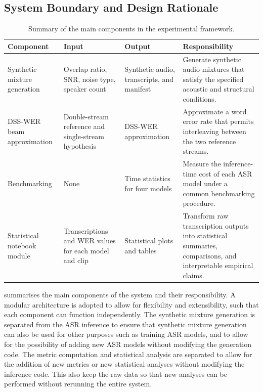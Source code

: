 \subsection{System Boundary and Design Rationale}
\begin{table}[ht]
\centering
\caption{Summary of the main components in the experimental framework.}
\label{tab:system_components}
\begin{tabular}{p{3.2cm}p{3.1cm}p{3.2cm}p{5.2cm}}
\toprule
\textbf{Component} & \textbf{Input} & \textbf{Output} & \textbf{Responsibility} \\
\midrule
Synthetic mixture generation &
Overlap ratio, SNR, noise type, speaker count &
Synthetic audio, transcripts, and manifest &
Generate synthetic audio mixtures that satisfy the specified acoustic and structural conditions. \\
\hline
DSS-WER beam approximation &
Double-stream reference and single-stream hypothesis &
DSS-WER approximation &
Approximate a word error rate that permits interleaving between the two reference streams. \\
\hline
Benchmarking &
None &
Time statistics for four models &
Measure the inference-time cost of each ASR model under a common benchmarking procedure. \\
\hline
Statistical notebook module &
Transcriptions and WER values for each model and clip &
Statistical plots and tables &
Transform raw transcription outputs into statistical summaries, comparisons, and interpretable empirical claims. \\
\bottomrule
\end{tabular}
\end{table}
 summarises the main components of the system and their responsibility. A modular architecture is adopted to allow for flexibility and extensibility, such that each component can function independently.
The synthetic mixture generation is separated from the ASR inference to ensure that synthetic mixture generation can also be used for other purposes such as training ASR models, and to allow for the possibility of adding new ASR models without modifying the generation code. The metric computation and statistical analysis are separated to allow for the addition of new metrics or new statistical analyses without modifying the inference code. This also keep the raw data so that new analyses can be performed without rerunning the entire system.

